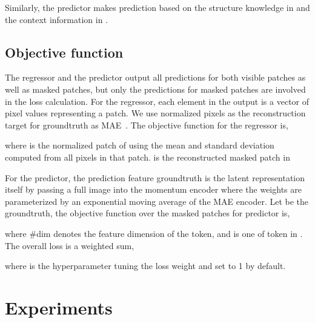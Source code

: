 \documentclass[runningheads]{llncs}
\begin{document}
Similarly, the predictor makes prediction based on the structure knowledge in  and the context information in .


\vspace{-1mm}
\subsection{Objective function}
\vspace{-1mm}
The regressor and the predictor output all predictions for both visible patches as well as masked patches, but only the predictions for masked patches are involved in the loss calculation. 
For the regressor, each element in the output is a vector of pixel values representing a patch. We use normalized pixels as the reconstruction target for groundtruth as MAE~\cite{he2021masked}. The objective function for the regressor is,

where  is the normalized patch of  using the mean and standard deviation computed from all pixels in that patch.  is the reconstructed masked patch in 

For the predictor, the prediction feature groundtruth is the latent representation itself by passing a full image into the momentum encoder where the weights are parameterized by an exponential moving average of the MAE encoder. Let  be the groundtruth, the objective function over the masked patches for predictor is,

where \#dim denotes the feature dimension of the token, and  is one of token in . The overall loss is a weighted sum,

where  is the hyperparameter tuning the loss weight and set to 1 by default.
 
 

\vspace{-1mm}
\section{Experiments}
\vspace{-1mm}
\end{document}
